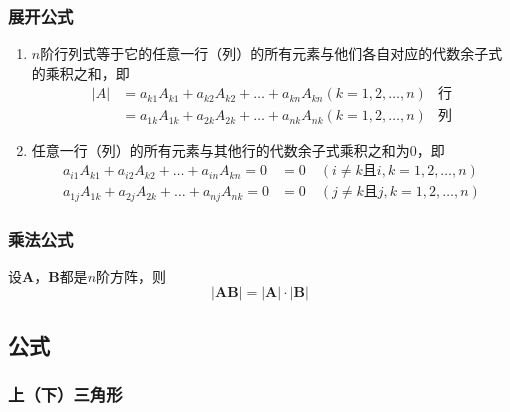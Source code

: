 \documentclass[a4paper,12pt]{article}
\begin{document}
    \subsubsection{展开公式}

    \begin{enumerate}
        \item $n$阶行列式等于它的任意一行（列）的所有元素与他们各自对应的代数余子式的乘积之和，即
        \begin{align*}
            |A| &= a_{k1}A_{k1} + a_{k2}A_{k2} + \dots + a_{kn}A_{kn} (k=1,2,\dots,n)  & \text{行} \\
            &= a_{1k}A_{1k} + a_{2k}A_{2k} + \dots + a_{nk}A_{nk} (k=1,2,\dots,n)  & \text{列}
        \end{align*}
        \item 任意一行（列）的所有元素与其他行的代数余子式乘积之和为0，即
        \begin{align*}
            a_{i1}A_{k1} + a_{i2}A_{k2} + \dots + a_{in}A_{kn} = 0 &= 0  \quad  (i \neq k \text{且} i,k=1,2,\dots,n)   \\
            a_{1j}A_{1k} + a_{2j}A_{2k} + \dots + a_{nj}A_{nk} = 0 &= 0  \quad  (j \neq k \text{且} j,k=1,2,\dots,n)
        \end{align*}
    \end{enumerate}

    \subsubsection{乘法公式}
    设$\mathbf{A}$，$\mathbf{B}$都是$n$阶方阵，则
    \[
        |\mathbf{AB}| = |\mathbf{A}| \cdot |\mathbf{B}|
    \]

    \subsection{公式}

    \subsubsection{上（下）三角形}
\end{document}
